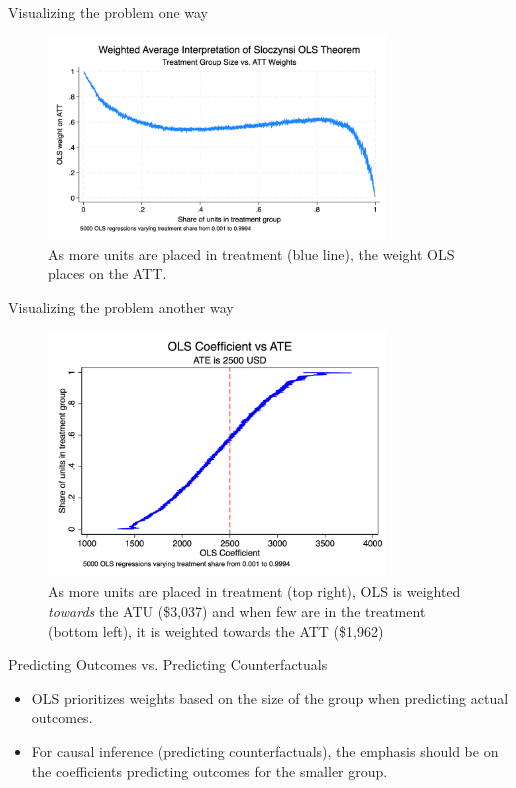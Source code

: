 \documentclass{beamer}
\begin{document}
\begin{frame}{Visualizing the problem one way}
    \begin{figure}
        \centering
        \includegraphics[width=0.8\textwidth]{./lecture_includes/tymon_weights_crossing}
        \caption{As more units are placed in treatment (blue line), the weight OLS places on the ATT.}
    \end{figure}
\end{frame}

\begin{frame}{Visualizing the problem another way}
    \begin{figure}
        \centering
        \includegraphics[width=0.8\textwidth]{./lecture_includes/ols_ate.png}
        \caption{As more units are placed in treatment (top right), OLS is weighted \emph{towards} the ATU (\$3,037) and when few are in the treatment (bottom left), it is weighted towards the ATT (\$1,962) }
    \end{figure}
\end{frame}



\begin{frame}{Predicting Outcomes vs. Predicting Counterfactuals}
  \begin{itemize}
    \item OLS prioritizes weights based on the size of the group when predicting actual outcomes.
    \item For causal inference (predicting counterfactuals), the emphasis should be on the coefficients predicting outcomes for the smaller group.
  \end{itemize}
\end{frame}
\end{document}

